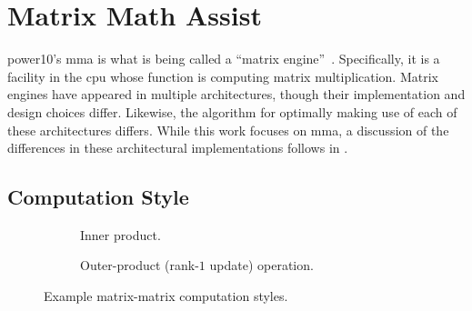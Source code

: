 \documentclass[\main/thesis.tex]{subfiles}
\begin{document}
\chapter{Matrix Math Assist}
\label{cha:mma}

\Gls{power10}'s \gls{mma} is what is being called a ``matrix engine''~\autocite{domke2020matrix}.
Specifically, it is a facility in the \gls{cpu} whose function is computing matrix multiplication.
Matrix engines have appeared in multiple architectures, though their implementation and design choices differ.
Likewise, the algorithm for optimally making use of each of these architectures differs.
While this work focuses on \gls{mma}, a discussion of the differences in these architectural implementations follows in .

\section{Computation Style}
\label{sec:compuationStyle}

\begin{figure}[t]
 \begin{subfigure}{.45\linewidth}
   \centering
   \caption{Inner product.}
   \label{fig:innerProduct}
 \end{subfigure}
 \hfill
  \begin{subfigure}{.45\linewidth}
    \centering
  \caption{Outer-product (rank-$1$ update) operation.}
    \label{fig:outerProduct}
  \end{subfigure}
  \hfill
  \caption{Example matrix-matrix computation styles.}
  \label{fig:product}
  \vspace{-0.15cm}
\end{figure}
\end{document}
